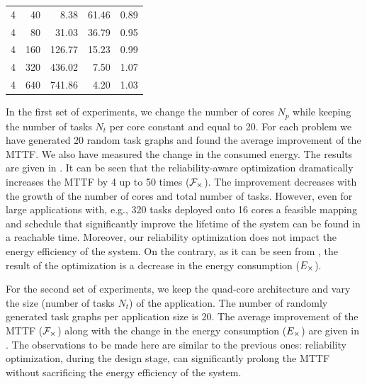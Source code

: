 \begin{table}[t]
{\begin{tabular}{|r|r|r|r|r|}
      4 &  40 &   8.38 & 61.46 & 0.89 \\
      4 &  80 &  31.03 & 36.79 & 0.95 \\
      4 & 160 & 126.77 & 15.23 & 0.99 \\
      4 & 320 & 436.02 &  7.50 & 1.07 \\
      4 & 640 & 741.86 &  4.20 & 1.03 \\
      \hline
    \end{tabular}
  }
\end{table}

In the first set of experiments, we change the number of cores $N_p$ while keeping the number of tasks $N_t$ per core constant and equal to 20. For each problem we have generated 20 random task graphs and found the average improvement of the MTTF. We also have measured the change in the consumed energy. The results are given in . It can be seen that the reliability-aware optimization dramatically increases the MTTF by 4 up to 50 times ($\mathcal{F}_{\times}$). The improvement decreases with the growth of the number of cores and total number of tasks. However, even for large applications with, e.g., 320 tasks deployed onto 16 cores a feasible mapping and schedule that significantly improve the lifetime of the system can be found in a reachable time. Moreover, our reliability optimization does not impact the energy efficiency of the system. On the contrary, as it can be seen from , the result of the optimization is a decrease in the energy consumption ($E_{\times}$).

For the second set of experiments, we keep the quad-core architecture and vary the size (number of tasks $N_t$) of the application. The number of randomly generated task graphs per application size is 20. The average improvement of the MTTF ($\mathcal{F}_{\times}$) along with the change in the energy consumption ($E_{\times}$) are given in . The observations to be made here are similar to the previous ones: reliability optimization, during the design stage, can significantly prolong the MTTF without sacrificing the energy efficiency of the system.

